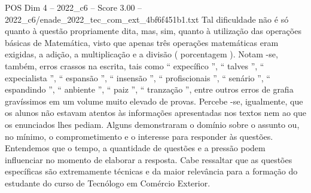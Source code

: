 \begin{textsample}{POS Dim 4 – 2022\_c6 – Score 3.00 – 2022\_c6/enade\_2022\_tec\_com\_ext\_4bf6f451b1.txt}
Tal dificuldade não é só quanto à questão propriamente dita, mas, sim, quanto à utilização das operações básicas de Matemática, visto que apenas três operações matemáticas eram exigidas, a adição, a multiplicação e a divisão ( porcentagem ).
Notam -se, também, erros crassos na escrita, tais como “ expecífico ”, “ talves ”, “ expecialista ”, “ espansão ”, “ insensão ”, “ profiscionais ”, “ senário ”, “ espandindo ”, “ anbiente ”, “ paiz ”, “ tranzação ”, entre outros erros de grafia gravíssimos em um volume muito elevado de provas.
Percebe -se, igualmente, que os alunos não estavam atentos às informações apresentadas nos textos nem ao que os enunciados lhes pediam.
Alguns demonstraram o domínio sobre o assunto ou, no mínimo, o comprometimento e o interesse para responder às questões.
Entendemos que o tempo, a quantidade de questões e a pressão podem influenciar no momento de elaborar a resposta.
Cabe ressaltar que as questões específicas são extremamente técnicas e da maior relevância para a formação do estudante do curso de Tecnólogo em Comércio Exterior.

\end{textsample}
